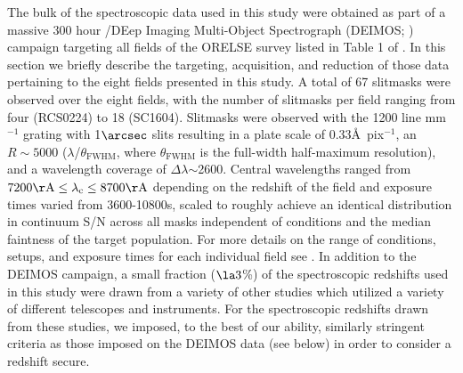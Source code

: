 \documentclass[a4paper,fleqn,usenatbib]{mnras}
\begin{document}
The bulk of the spectroscopic data used in this study were obtained as part of a massive 300 hour /DEep Imaging Multi-Object Spectrograph 
(DEIMOS; \citealt{Faber2003}) campaign targeting all fields of the ORELSE survey listed in Table 1 of \citet{Lubin2009}. In this section we briefly describe the targeting, acquisition, and 
reduction of those data pertaining to the eight fields presented in this study. A total of 67 slitmasks were observed over the eight fields, with the number
of slitmasks per field ranging from four (RCS0224) to 18 (SC1604). Slitmasks were observed with the 1200 line mm$^{-1}$ grating with 1$\arcsec$ slits resulting
in a plate scale of 0.33\AA\ pix$^{-1}$, an $R\sim5000$ ($\lambda$/$\theta_{\mathrm{FWHM}}$, where $\theta_{\mathrm{FWHM}}$ is the full-width half-maximum resolution), and 
a wavelength coverage of $\Delta\lambda$$\sim$2600. Central wavelengths ranged from $7200\rm{\AA} \le \lambda_{c} \le 8700\rm{\AA}$ depending on the 
redshift of the field and exposure times varied from 3600-10800s, scaled to roughly achieve an identical distribution in continuum S/N across all masks
independent of conditions and the median faintness of the target population. For more details
on the range of conditions, setups, and exposure times for each individual field see \citet{Rumbaugh2017}. In addition to the DEIMOS campaign,
a small fraction ($\la3$\%) of the spectroscopic redshifts used in this study were drawn from a variety of other studies	%
\citep{Oke1998, Gal2004, Tanaka2008, Mei2012} which utilized a variety of different telescopes and instruments. For the spectroscopic redshifts 
drawn from these studies, we imposed, to the best of our ability, similarly stringent criteria as those imposed on the DEIMOS data (see below) in order to 
consider a redshift secure. 
\end{document}
